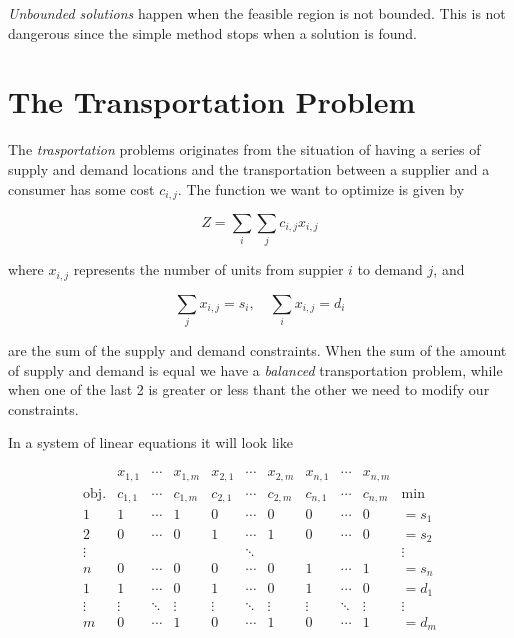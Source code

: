 \emph{Unbounded solutions} happen when the feasible region is not bounded. This is not dangerous since the simple method stops when a solution is found.

\section{The Transportation Problem}

The \emph{trasportation} problems originates from the situation of having a series of supply and demand locations and the transportation between a
supplier and a consumer has some cost \(c_{i, j}\). The function we want to optimize is given by

\[
	Z = \sum_{i} \sum_{j} c_{i,j} x_{i, j}
\]

where \(x_{i, j}\) represents the number of units from suppier \(i\) to demand \(j\), and

\[
	\sum_j x_{i, j} = s_i, \quad \sum_i x_{i, j} = d_i
\]

are the sum of the supply and demand constraints. When the sum of the  amount of supply and demand is equal we have a \emph{balanced} transportation problem,
while when one of the last 2 is greater or less thant the other we need to modify our constraints.

In a system of linear equations it will look like

\[
	\begin{array}{c|ccc|ccc|ccc|c}
		            & x_{1,1} & \cdots & x_{1,m} & x_{2,1} & \cdots & x_{2,m} & x_{n,1} & \cdots & x_{n,m} &        \\ \hline
		\text{obj.} & c_{1,1} & \cdots & c_{1,m} & c_{2,1} & \cdots & c_{2,m} & c_{n,1} & \cdots & c_{n,m} & \min   \\ \hline
		1           & 1       & \cdots & 1       & 0       & \cdots & 0       & 0       & \cdots & 0       & = s_1  \\
		2           & 0       & \cdots & 0       & 1       & \cdots & 1       & 0       & \cdots & 0       & = s_2  \\
		\vdots      &         &        &         &         & \ddots &         &         &        &         & \vdots \\
		n           & 0       & \cdots & 0       & 0       & \cdots & 0       & 1       & \cdots & 1       & = s_n  \\ \hline
		1           & 1       & \cdots & 0       & 1       & \cdots & 0       & 1       & \cdots & 0       & = d_1  \\
		\vdots      & \vdots  & \ddots & \vdots  & \vdots  & \ddots & \vdots  & \vdots  & \ddots & \vdots  & \vdots \\
		m           & 0       & \cdots & 1       & 0       & \cdots & 1       & 0       & \cdots & 1       & = d_m
	\end{array}
\]

